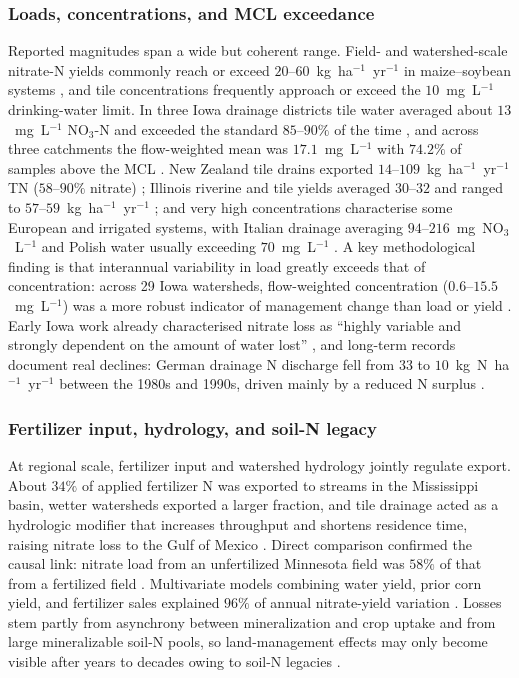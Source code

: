 \subsubsection{Loads, concentrations, and MCL exceedance}

Reported magnitudes span a wide but coherent range. Field- and watershed-scale
nitrate-N yields commonly reach or exceed $20$--$60$~kg~ha$^{-1}$~yr$^{-1}$ in
maize--soybean systems
\parencite{Gentry2009,Gentry2014,Dattamudi2020,Tomer2008}, and tile
concentrations frequently approach or exceed the $10$~mg~L$^{-1}$
drinking-water limit. In three Iowa drainage districts tile water averaged
about $13$~mg~L$^{-1}$ NO$_3$-N and exceeded the standard $85$--$90\%$ of the
time \parencite{Schilling2012b}, and across three catchments the flow-weighted
mean was $17.1$~mg~L$^{-1}$ with $74.2\%$ of samples above the MCL
\parencite{Ikenberry2014}. New Zealand tile drains exported
$14$--$109$~kg~ha$^{-1}$~yr$^{-1}$ TN ($58$--$90\%$ nitrate)
\parencite{Tanner2011}; Illinois riverine and tile yields averaged $30$--$32$
and ranged to $57$--$59$~kg~ha$^{-1}$~yr$^{-1}$ \parencite{Gentry2014}; and very
high concentrations characterise some European and irrigated systems, with
Italian drainage averaging $94$--$216$~mg~NO$_3$~L$^{-1}$ \parencite{ROSSI1991}
and Polish water usually exceeding $70$~mg~L$^{-1}$ \parencite{Dragon2016}. A
key methodological finding is that interannual variability in load greatly
exceeds that of concentration: across 29 Iowa watersheds, flow-weighted
concentration ($0.6$--$15.5$~mg~L$^{-1}$) was a more robust indicator of
management change than load or yield \parencite{Danalatos2022}. Early Iowa work
already characterised nitrate loss as ``highly variable and strongly dependent
on the amount of water lost'' \parencite{BAKER1975}, and long-term records
document real declines: German drainage N discharge fell from $33$ to
$10$~kg~N~ha$^{-1}$~yr$^{-1}$ between the 1980s and 1990s, driven mainly by a
reduced N surplus \parencite{Hirt2005b}.

\subsubsection{Fertilizer input, hydrology, and soil-N legacy}

At regional scale, fertilizer input and watershed hydrology jointly regulate
export. About $34\%$ of applied fertilizer N was exported to streams in the
Mississippi basin, wetter watersheds exported a larger fraction, and tile
drainage acted as a hydrologic modifier that increases throughput and shortens
residence time, raising nitrate loss to the Gulf of Mexico
\parencite{Raymond2012}. Direct comparison confirmed the causal link: nitrate
load from an unfertilized Minnesota field was $58\%$ of that from a fertilized
field \parencite{Ghane2016b}. Multivariate models combining water yield, prior
corn yield, and fertilizer sales explained $96\%$ of annual nitrate-yield
variation \parencite{Gentry2014}. Losses stem partly from asynchrony between
mineralization and crop uptake and from large mineralizable soil-N pools, so
land-management effects may only become visible after years to decades owing to
soil-N legacies \parencite{Cambardella1999,Bauwe2020}.

